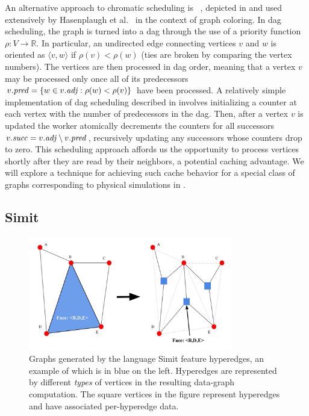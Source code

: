 An alternative approach to chromatic scheduling is 
~\cite{JonesPl93},
depicted in  and used extensively by 
Hasenplaugh et al.~\cite{HasenplaughKaLe14} in the context of graph
coloring.  In dag scheduling, the graph
is turned into a dag through the use of a priority function 
$\rho : V \rightarrow \mathbb{R}$.  In particular, an undirected
edge connecting vertices $v$ and $w$ is oriented as $\langle v, w \rangle$
if $\rho(v) < \rho(w)$ (ties are broken by comparing the vertex numbers).  
The vertices are then processed in dag order, meaning that a vertex
$v$ may be processed only once all of its predecessors 
$\attrib{v}{\id{pred}} = \set{w \in \attrib{v}{\id{adj}} : \rho(w) < \rho(v)}$
have been processed.  A relatively simple implementation of dag
scheduling  described in 
 involves initializing a counter at each vertex with the 
number of predecessors in the dag.  Then, after a vertex $v$ is updated
the worker atomically decrements the counters for all successors 
$\attrib{v}{\id{succ}} = \attrib{v}{\id{adj}} \setminus \attrib{v}{\id{pred}}$,
recursively updating any successors whose counters drop to zero.
This scheduling approach affords us the opportunity
to process vertices shortly after they are read by their neighbors,
a potential caching advantage.  We will explore a technique 
for achieving such cache behavior for a special class of graphs 
corresponding to physical simulations in .



\subsection{Simit}

\begin{figure}[h]
\centering
\includegraphics[width=3.5in]{figures/hyperedge.pdf}
\caption{Graphs generated by the language Simit feature hyperedges, an example
of which is in blue on the left.  Hyperedges are represented by different
\emph{types} of vertices in the resulting data-graph computation.
The square vertices in the figure represent hyperedges and have associated
per-hyperedge data.}
\label{fig:hyperedge}
\end{figure}

